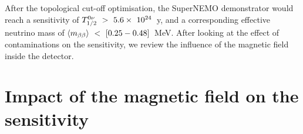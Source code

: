 After the topological cut-off optimisation, the SuperNEMO demonstrator would reach a sensitivity of $T_{1/2}^{0\nu}~>~5.6\times~10^{24}$~y, and a corresponding effective neutrino mass of $\langle m_{\beta\beta}\rangle~<~[0.25-0.48]$~MeV.
After looking at the effect of contaminations on the sensitivity, we review the influence of the magnetic field inside the detector.

\section{Impact of the magnetic field on the sensitivity}
\label{sec:magnetic_field}

